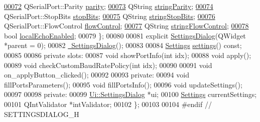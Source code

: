\begin{DoxyCode}
\hypertarget{a00132_source_l00072}{}\hyperlink{a00075_ae08a00aa2e45218dade9046e3624cce7}{00072}         QSerialPort::Parity \hyperlink{a00075_ae08a00aa2e45218dade9046e3624cce7}{parity};
\hypertarget{a00132_source_l00073}{}\hyperlink{a00075_aa2c662b2fb315f038e827d63d83b059b}{00073}         QString \hyperlink{a00075_aa2c662b2fb315f038e827d63d83b059b}{stringParity};
\hypertarget{a00132_source_l00074}{}\hyperlink{a00075_ab88ff384f7c1127bcbe2dd97b49696a4}{00074}         QSerialPort::StopBits \hyperlink{a00075_ab88ff384f7c1127bcbe2dd97b49696a4}{stopBits};
\hypertarget{a00132_source_l00075}{}\hyperlink{a00075_abde3c8410f779688ce6c2fcbbbb84f10}{00075}         QString \hyperlink{a00075_abde3c8410f779688ce6c2fcbbbb84f10}{stringStopBits};
\hypertarget{a00132_source_l00076}{}\hyperlink{a00075_aa962a6e7dbb8338af154305e4ff46cfc}{00076}         QSerialPort::FlowControl \hyperlink{a00075_aa962a6e7dbb8338af154305e4ff46cfc}{flowControl};
\hypertarget{a00132_source_l00077}{}\hyperlink{a00075_a1b0a388ec5059bd2628acf9b7728f2f3}{00077}         QString \hyperlink{a00075_a1b0a388ec5059bd2628acf9b7728f2f3}{stringFlowControl};
\hypertarget{a00132_source_l00078}{}\hyperlink{a00075_ae1bfec3d6530f9791451d12aacfcb014}{00078}         \textcolor{keywordtype}{bool} \hyperlink{a00075_ae1bfec3d6530f9791451d12aacfcb014}{localEchoEnabled};
00079     \};
00080 
00081     \textcolor{keyword}{explicit} \hyperlink{a00075_abf4568621eef32ca85b919f2209cdc42}{SettingsDialog}(QWidget *parent = 0);
00082     \hyperlink{a00075_ac48f54d4472902be0a3845a69167f068}{~SettingsDialog}();
00083 
00084     \hyperlink{a00075_dc/d9a/a00218}{Settings} \hyperlink{a00075_afeb533d711d0392b9856c63b40b65ad7}{settings}() \textcolor{keyword}{const};
00085 
00086 \textcolor{keyword}{private} slots:
00087     \textcolor{keywordtype}{void} showPortInfo(\textcolor{keywordtype}{int} idx);
00088     \textcolor{keywordtype}{void} apply();
00089     \textcolor{keywordtype}{void} checkCustomBaudRatePolicy(\textcolor{keywordtype}{int} idx);
00090 
00091     \textcolor{keywordtype}{void} on\_applyButton\_clicked();
00092 
00093 \textcolor{keyword}{private}:
00094     \textcolor{keywordtype}{void} fillPortsParameters();
00095     \textcolor{keywordtype}{void} fillPortsInfo();
00096     \textcolor{keywordtype}{void} updateSettings();
00097 
00098 \textcolor{keyword}{private}:
00099     \hyperlink{a00076}{Ui::SettingsDialog} *ui;
00100     \hyperlink{a00075_dc/d9a/a00218}{Settings} currentSettings;
00101     QIntValidator *intValidator;
00102 \};
00103 
00104 \textcolor{preprocessor}{#endif // SETTINGSDIALOG\_H}
\end{DoxyCode}
